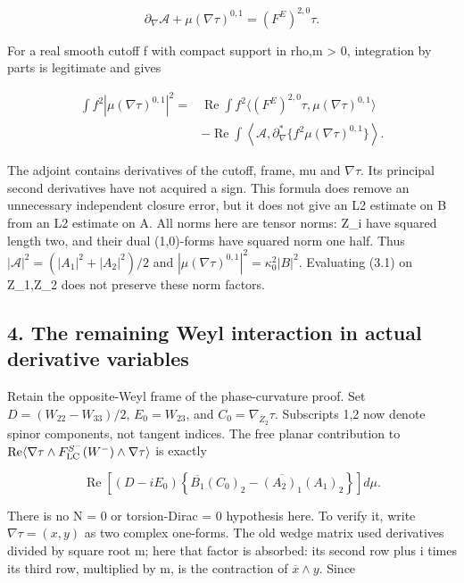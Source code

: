 \documentclass[
  10pt,
]{article}
\begin{document}
\[
 \partial_\nabla\mathcal A+\mu(\nabla\tau)^{0,1}
                         =(F^E)^{2,0}\tau.               \tag{3.1}
\]

For a real smooth cutoff f with compact support in rho,m \textgreater{}
0, integration by parts is legitimate and gives

\[
\begin{aligned}
 \int f^2|\mu(\nabla\tau)^{0,1}|^2
 ={}&\operatorname{Re}\int f^2
       \langle(F^E)^{2,0}\tau,\mu(\nabla\tau)^{0,1}\rangle\\
 &-\operatorname{Re}\int\left\langle\mathcal A,
       \partial_\nabla^*\{f^2\mu(\nabla\tau)^{0,1}\}\right\rangle.
\end{aligned}                                             \tag{3.2}
\]

The adjoint contains derivatives of the cutoff, frame, mu and
\(\nabla\tau\). Its principal second derivatives have not acquired a
sign. This formula does remove an unnecessary independent closure error,
but it does not give an L2 estimate on B from an L2 estimate on A. All
norms here are tensor norms: Z\_i have squared length two, and their
dual (1,0)-forms have squared norm one half. Thus
\(|\mathcal A|^2=(|A_1|^2+|A_2|^2)/2\) and
\(|\mu(\nabla\tau)^{0,1}|^2=\kappa_0^2|B|^2\). Evaluating (3.1) on
Z\_1,Z\_2 does not preserve these norm factors.

\hypertarget{the-remaining-weyl-interaction-in-actual-derivative-variables}{%
\subsection{4. The remaining Weyl interaction in actual derivative
variables}\label{the-remaining-weyl-interaction-in-actual-derivative-variables}}

Retain the opposite-Weyl frame of the phase-curvature proof. Set
\(D=(W_{22}-W_{33})/2\), \(E_0=W_{23}\), and
\(C_0=\nabla_{\overline Z_2}\tau\). Subscripts 1,2 now denote spinor
components, not tangent indices. The free planar contribution to
\(\operatorname{Re}\langle\nabla\tau\wedge  F_{\rm LC}^{S^-}(W^-)\wedge\nabla\tau\rangle\)
is exactly

\[
 \boxed{\operatorname{Re}\left[(D-iE_0)
    \left\{\overline{B_1}(C_0)_2
       -\overline{(A_2)_1}(A_1)_2\right\}\right]d\mu.}   \tag{4.1}
\]

There is no N = 0 or torsion-Dirac = 0 hypothesis here. To verify it,
write \(\nabla\tau=(x,y)\) as two complex one-forms. The old wedge
matrix used derivatives divided by square root m; here that factor is
absorbed: its second row plus i times its third row, multiplied by m, is
the contraction of \(\overline x\wedge y\). Since
\end{document}
